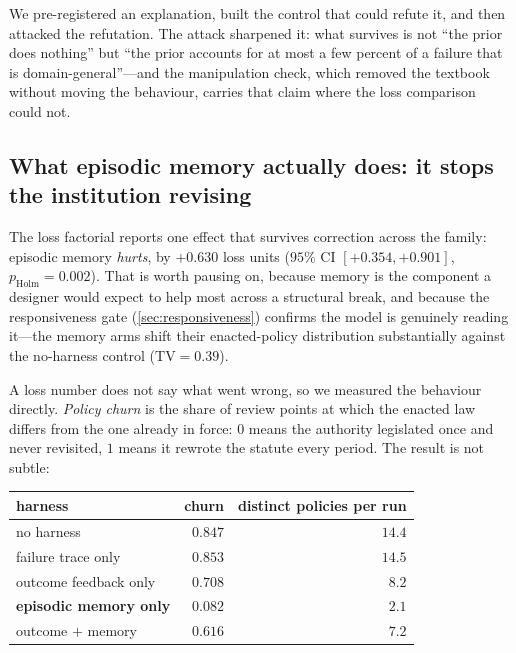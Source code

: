 \documentclass[11pt]{article}
\begin{document}
\begin{takeaway}
We pre-registered an explanation, built the control that could refute it, and then attacked the
refutation. The attack sharpened it: what survives is not ``the prior does nothing'' but ``the prior
accounts for at most a few percent of a failure that is domain-general''---and the manipulation
check, which removed the textbook without moving the behaviour, carries that claim where the loss
comparison could not.
\end{takeaway}

\subsection{What episodic memory actually does: it stops the institution revising}
\label{sec:churn}

The loss factorial reports one effect that survives correction across the family: episodic memory
\emph{hurts}, by $+0.630$ loss units ($95\%$ CI $[+0.354, +0.901]$, $p_{\text{Holm}}=0.002$). That is
worth pausing on, because memory is the component a designer would expect to help most across a
structural break, and because the responsiveness gate (\cref{sec:responsiveness}) confirms the model
is genuinely reading it---the memory arms shift their enacted-policy distribution substantially
against the no-harness control ($\mathrm{TV}=0.39$).

A loss number does not say what went wrong, so we measured the behaviour directly. \emph{Policy
churn} is the share of review points at which the enacted law differs from the one already in force:
$0$ means the authority legislated once and never revisited, $1$ means it rewrote the statute every
period. The result is not subtle:

\begin{center}\small
\begin{tabular}{@{}lrr@{}}
\toprule
harness & churn & distinct policies per run \\
\midrule
no harness & $0.847$ & $14.4$ \\
failure trace only & $0.853$ & $14.5$ \\
outcome feedback only & $0.708$ & $8.2$ \\
\textbf{episodic memory only} & $\mathbf{0.082}$ & $\mathbf{2.1}$ \\
outcome $+$ memory & $0.616$ & $7.2$ \\
\bottomrule
\end{tabular}
\end{center}
\end{document}
